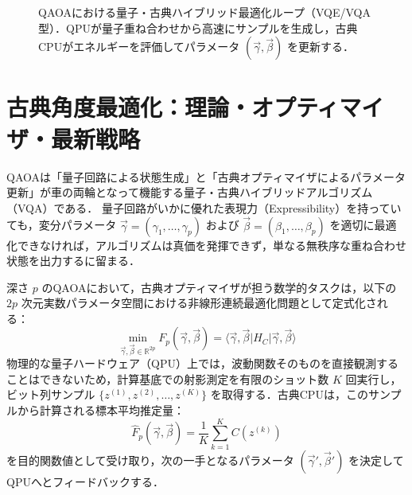 \documentclass[11pt,a4paper,oneside,openany]{ltjsbook}
\theoremstyle{definition}
\theoremstyle{plain}
\theoremstyle{remark}
\newcommand{\mel}[3]{\langle#1|#2|#3\rangle}
\begin{document}
\begin{figure}[htbp]
\caption{QAOAにおける量子・古典ハイブリッド最適化ループ（VQE/VQA型）．QPUが量子重ね合わせから高速にサンプルを生成し，古典CPUがエネルギーを評価してパラメータ $(\vec{\gamma}, \vec{\beta})$ を更新する．}
\label{fig:vqa_loop}
\end{figure}

\section{古典角度最適化：理論・オプティマイザ・最新戦略}
\label{sec:classical_optimization}

QAOAは「量子回路による状態生成」と「古典オプティマイザによるパラメータ更新」が車の両輪となって機能する量子・古典ハイブリッドアルゴリズム（VQA\cite{cerezo2021variational}）である．
量子回路がいかに優れた表現力（Expressibility）を持っていても，変分パラメータ $\vec{\gamma} = (\gamma_1, \dots, \gamma_p)$ および $\vec{\beta} = (\beta_1, \dots, \beta_p)$ を適切に最適化できなければ，アルゴリズムは真価を発揮できず，単なる無秩序な重ね合わせ状態を出力するに留まる．

深さ $p$ のQAOAにおいて，古典オプティマイザが担う数学的タスクは，以下の $2p$ 次元実数パラメータ空間における非線形連続最適化問題として定式化される：
\begin{equation}
    \min_{\vec{\gamma}, \vec{\beta} \in \mathbb{R}^{2p}} F_p(\vec{\gamma}, \vec{\beta}) = \mel{\vec{\gamma}, \vec{\beta}}{H_C}{\vec{\gamma}, \vec{\beta}}
\end{equation}
物理的な量子ハードウェア（QPU）上では，波動関数そのものを直接観測することはできないため，計算基底での射影測定を有限のショット数 $K$ 回実行し，ビット列サンプル $\{z^{(1)}, z^{(2)}, \dots, z^{(K)}\}$ を取得する．古典CPUは，このサンプルから計算される標本平均推定量：
\begin{equation}
    \hat{F}_p(\vec{\gamma}, \vec{\beta}) = \frac{1}{K} \sum_{k=1}^K C(z^{(k)})
\end{equation}
を目的関数値として受け取り，次の一手となるパラメータ $(\vec{\gamma}', \vec{\beta}')$ を決定してQPUへとフィードバックする．
\end{document}
